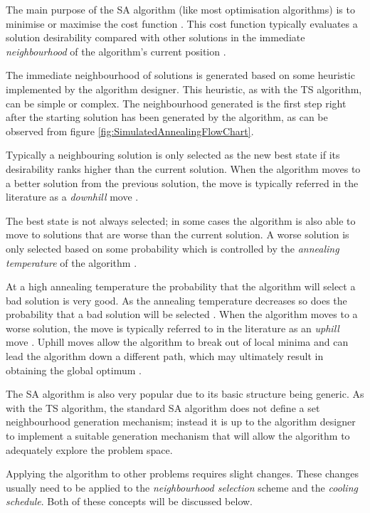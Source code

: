 The main purpose of the SA algorithm (like most optimisation algorithms) is to minimise or maximise the cost function \cite{SASingleMultiObj}. This cost function typically evaluates a solution desirability compared with other solutions in the immediate \emph{neighbourhood} of the algorithm's current position \cite{TheoPraticalSA}. 

The immediate neighbourhood of solutions is generated based on some heuristic implemented by the algorithm designer\cite{AIModernApproach}. This heuristic, as with the TS algorithm, can be simple or complex. The neighbourhood generated is the first step right after the starting solution has been generated by the algorithm, as can be observed from figure \ref{fig:SimulatedAnnealingFlowChart}.

Typically a neighbouring solution is only selected as the new best state if its desirability ranks higher than the current solution. When the algorithm moves to a better solution from the previous solution, the move is typically referred in the literature as a \emph{downhill} move \cite{CurveFittingSA}.

The best state is not always selected; in some cases the algorithm is also able to move to solutions that are worse than the current solution. A worse solution is only selected based on some probability which is controlled by the \emph{annealing temperature} of the algorithm \cite{TheoPraticalSA}. 

At a high annealing temperature the probability that the algorithm will select a bad solution is very good. As the annealing temperature decreases so does the probability that a bad solution will be selected \cite{CurveFittingSA}. When the algorithm moves to a worse solution, the move is typically referred to in the literature as an \emph{uphill} move \cite{CurveFittingSA}. Uphill moves allow the algorithm to break out of local minima and can lead the algorithm down a different path, which may ultimately result in obtaining the global optimum \cite{SASingleMultiObj}. 

The SA algorithm is also very popular due to its basic structure being generic\cite{VariousCoolingSA}. As with the TS algorithm, the standard SA algorithm does not define a set neighbourhood generation mechanism; instead it is up to the algorithm designer to implement a suitable generation mechanism that will allow the algorithm to adequately explore the problem space\cite{VariousCoolingSA}. 

Applying the algorithm to other problems requires slight changes. These changes usually need to be applied to the \emph{neighbourhood selection} scheme and the \emph{cooling schedule}\cite{VariousCoolingSA,DormRoomSA}. Both of these concepts will be discussed below.

